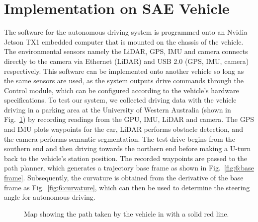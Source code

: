 \section{Implementation on SAE Vehicle} \label{sec:6:implement}
The software for the autonomous driving system is programmed onto an Nvidia Jetson TX1  embedded computer that is mounted on the chassis of the vehicle. The environmental sensors namely the LiDAR, GPS, IMU and camera connects directly to the camera via Ethernet (LiDAR) and USB 2.0 (GPS, IMU, camera) respectively. This software can be implemented onto another vehicle so long as the same sensors are used, as the system outputs drive commands through the Control module, which can be configured according to the vehicle's hardware specifications. To test our system, we collected driving data with the vehicle driving in a parking area at the University of Western Australia (shown in Fig.~\ref{fig:6:map}) by recording readings from the GPU, IMU, LiDAR and camera. The GPS and IMU plots waypoints for the car, LiDAR performs obstacle detection, and the camera performs semantic segmentation. The test drive begins from the southern end and then driving towards the northern end before making a U-turn back to the vehicle's station position. The recorded waypoints are passed to the path planner, which generates a trajectory base frame as shown in Fig.~\ref{fig:6:base frame}. Subsequently, the curvature is obtained from the derivative of the base frame as Fig.~\ref{fig:6:curvature}, which can then be used to determine the steering angle for autonomous driving. 

\begin{figure}[H]
	\centering
	\def\svgwidth{0.7\linewidth}
	
	\caption{Map showing the path taken by the vehicle in with a solid red line.}
	\label{fig:6:map}
\end{figure}

